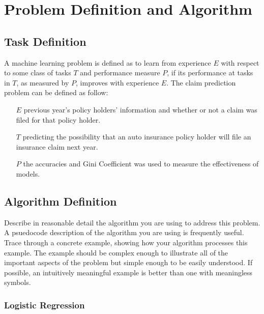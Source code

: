 \documentclass[conference,draft]{IEEEtran}
\begin{document}
\section{Problem Definition and Algorithm}

\subsection{Task Definition}


A machine learning problem is defined as to learn from experience $E$ with
respect to some class of tasks $T$ and performance measure $P$, if its
performance at tasks in $T$, as measured by $P$, improves with experience
$E$\cite{Mitchell:1997:ML:541177}.
The claim prediction problem can be defined as follow:
\begin{itemize}[] 
    \item[$E$] previous year's policy holders' information and whether or not a
        claim was filed for that policy holder.
    \item[$T$] predicting the possibility that an auto insurance policy
        holder will file an insurance claim next year.
    \item[$P$] the accuracies and Gini Coefficient was used to measure the
        effectiveness of models.
\end{itemize}
\subsection{Algorithm Definition}

\scriptsize{
Describe in reasonable detail the algorithm you are using to address this
problem. A psuedocode description of the algorithm you are using is frequently
useful. Trace through a concrete example, showing how your algorithm processes
this example. The example should be complex enough to illustrate all of the
important aspects of the problem but simple enough to be easily understood. If
possible, an intuitively meaningful example is better than one with meaningless
symbols.
}\normalsize

\subsubsection{Logistic Regression}
\end{document}
